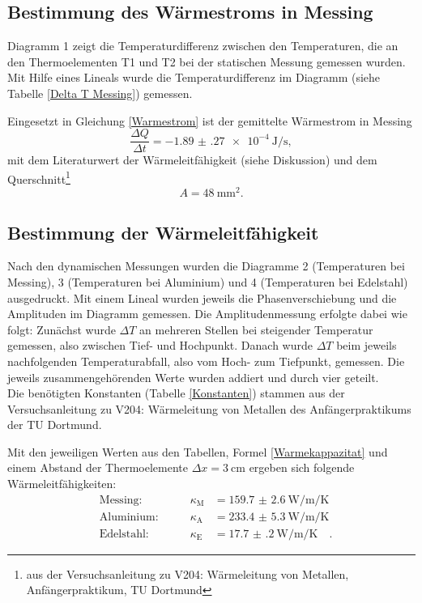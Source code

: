 \subsection{Bestimmung des Wärmestroms in Messing}
Diagramm 1 zeigt die Temperaturdifferenz zwischen den Temperaturen, die an den Thermoelementen T1 und T2 bei der statischen Messung gemessen wurden. Mit Hilfe eines Lineals wurde die Temperaturdifferenz im Diagramm (siehe Tabelle \ref{Delta T Messing}) gemessen.

Eingesetzt in Gleichung \eqref{Warmestrom} ist der gemittelte Wärmestrom in Messing
\begin{equation}
	\frac{\Delta Q}{\Delta t} = \SI{-1.89(27)e-4}{\joule\per\second},
\end{equation}
mit dem Literaturwert der Wärmeleitfähigkeit (siehe Diskussion) und dem Querschnitt\footnote{aus der Versuchsanleitung zu V204: Wärmeleitung von Metallen, Anfängerpraktikum, TU Dortmund}
\begin{equation}
	A = \SI{48}{\milli\metre\squared}.
\end{equation}
\clearpage

\subsection{Bestimmung der Wärmeleitfähigkeit}
Nach den dynamischen Messungen wurden die Diagramme 2 (Temperaturen bei Messing), 3 (Temperaturen bei Aluminium) und 4 (Temperaturen bei Edelstahl) ausgedruckt. Mit einem Lineal wurden jeweils die Phasenverschiebung und die Amplituden im Diagramm gemessen. Die Amplitudenmessung erfolgte dabei wie folgt: Zunächst wurde $\Delta T$ an mehreren Stellen bei steigender Temperatur gemessen, also zwischen Tief- und Hochpunkt. Danach wurde $\Delta T$ beim jeweils nachfolgenden Temperaturabfall, also vom Hoch- zum Tiefpunkt, gemessen. Die jeweils zusammengehörenden Werte wurden addiert und durch vier geteilt. \\
Die benötigten Konstanten (Tabelle \ref{Konstanten}) stammen aus der Versuchsanleitung zu V204: Wärmeleitung von Metallen des Anfängerpraktikums der TU Dortmund.







Mit den jeweiligen Werten aus den Tabellen, Formel \eqref{Warmekappazitat} und einem Abstand der Thermoelemente $\Delta x = \SI{3}{\centi\metre}$ ergeben sich folgende Wärmeleitfähigkeiten:
\begin{align}
	&\text{Messing:}\qquad & \kappa_\text{M} &= \SI{159.7(26)}{\watt\per\metre\per\kelvin} \\
	&\text{Aluminium:}\qquad & \kappa_\text{A} &= \SI{233.4(53)}{\watt\per\metre\per\kelvin} \\
	&\text{Edelstahl:}\qquad & \kappa_\text{E} &= \SI{17.7(2)}{\watt\per\metre\per\kelvin}\quad.
\end{align}



